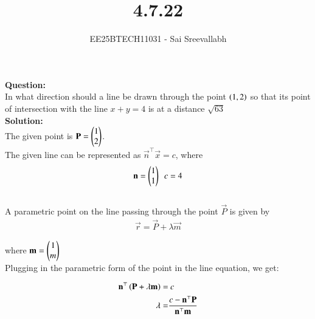 \documentclass[journal]{IEEEtran}
\begin{document}

\vspace{3cm}

\title{4.7.22}
\author {EE25BTECH11031 - Sai Sreevallabh}
{\let\newpage\relax\maketitle}

\renewcommand{\thefigure}{\theenumi}
\renewcommand{\thetable}{\theenumi}
\setlength{\intextsep}{10pt} %


\renewcommand{\thetable}{\theenumi}

\textbf{Question: }\\

In what direction should a line be drawn through the point $\left(1,2\right)$ so that its point of intersection with the line $x+y=4$ is at a distance $\sqrt{63}$\\

\textbf{Solution: }\\

The given point is $\mathbf{P} = \begin{pmatrix}1\\2\end{pmatrix}$.\\

The given line can be represented as $\vec{n}^\top\vec{x} = c$, where 
\begin{align}
    \mathbf{n} = \begin{pmatrix}1\\1\end{pmatrix} \ \ c = 4
\end{align}\\

A parametric point on the line passing through the point $\vec{P}$ is given by 
\begin{align}
    \vec{r} = \vec{P} + \lambda\vec{m}
\end{align}

where $\mathbf{m} = \begin{pmatrix}1\\m\end{pmatrix}$\\

Plugging in the parametric form of the point in the line equation, we get: 

\begin{align}
    \mathbf{n}^\top\left(\mathbf{P+\lambda\mathbf{m}}\right) =&\  c\\
    \lambda =& \frac{c-\mathbf{n}^\top\mathbf{P}}{\mathbf{n}^\top\mathbf{m}}
\end{align}\\
\end{document}
